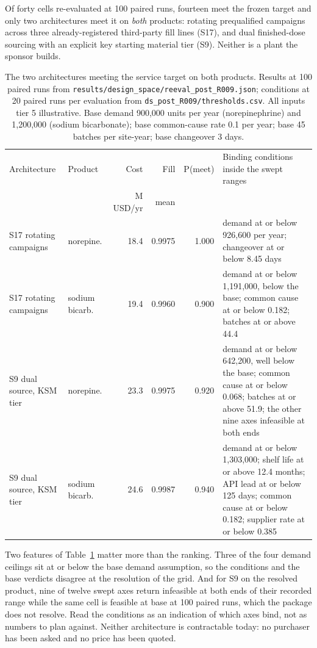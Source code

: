 Of forty cells re-evaluated at 100 paired runs, fourteen meet the frozen target and only two
architectures meet it on \emph{both} products: rotating prequalified campaigns across three
already-registered third-party fill lines (S17), and dual finished-dose sourcing with an explicit key
starting material tier (S9). Neither is a plant the sponsor builds.

\begin{table}[htbp]
\centering
\caption{The two architectures meeting the service target on both products. Results at 100 paired
runs from \texttt{results/design\_space/reeval\_post\_R009.json}; conditions at 20 paired runs per
evaluation from \texttt{ds\_post\_R009/thresholds.csv}. All inputs tier 5 illustrative. Base demand
900,000 units per year (norepinephrine) and 1,200,000 (sodium bicarbonate); base common-cause rate
0.1 per year; base 45 batches per site-year; base changeover 3 days.}
\label{tab:clearboth}
\footnotesize
\setlength{\tabcolsep}{4pt}
\begin{tabular}{@{}p{2.3cm}p{1.7cm}rrrp{5.4cm}@{}}
\toprule
Architecture & Product & Cost & Fill & P(meet) & Binding conditions inside the swept ranges \\
 & & M USD/yr & mean & & \\
\midrule
S17 rotating campaigns & norepine. & 18.4 & 0.9975 & 1.000 & demand at or below 926,600 per year; changeover at or below 8.45 days \\
S17 rotating campaigns & sodium bicarb. & 19.4 & 0.9960 & 0.900 & demand at or below 1,191,000, below the base; common cause at or below 0.182; batches at or above 44.4 \\
S9 dual source, KSM tier & norepine. & 23.3 & 0.9975 & 0.920 & demand at or below 642,200, well below the base; common cause at or below 0.068; batches at or above 51.9; the other nine axes infeasible at both ends \\
S9 dual source, KSM tier & sodium bicarb. & 24.6 & 0.9987 & 0.940 & demand at or below 1,303,000; shelf life at or above 12.4 months; API lead at or below 125 days; common cause at or below 0.182; supplier rate at or below 0.385 \\
\bottomrule
\end{tabular}
\end{table}

Two features of Table~\ref{tab:clearboth} matter more than the ranking. Three of the four demand
ceilings sit at or below the base demand assumption, so the conditions and the base verdicts disagree
at the resolution of the grid. And for S9 on the resolved product, nine of twelve swept axes return
infeasible at both ends of their recorded range while the same cell is feasible at base at 100 paired
runs, which the package does not resolve. Read the conditions as an indication of which axes bind,
not as numbers to plan against. Neither architecture is contractable today: no purchaser has been
asked and no price has been quoted.

